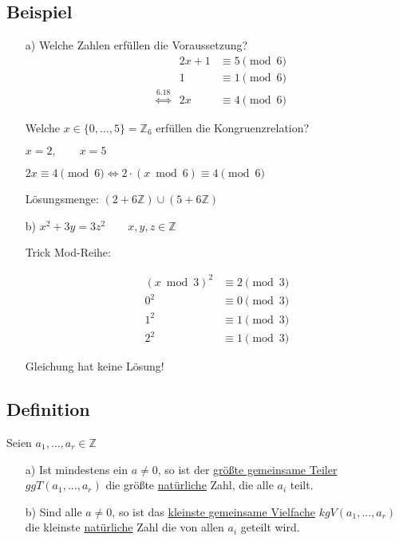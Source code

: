 \documentclass[a4paper, 12pt, twoside] {article}
\begin{document}
\subsection{Beispiel} %

\begin{itemize}
\item[a)] Welche Zahlen erfüllen die Voraussetzung?
\begin{align*}
&											&	2x + 1 &\equiv 5 \pmod 6 \\
&											&	      1 &\equiv 1 \pmod 6 \\
& \overset{\text{6.18}}{\Leftrightarrow}	&	     2x &\equiv 4 \pmod 6
\end{align*}

Welche $x \in \{0,...,5\} = \mathbb{Z}_6$ erfüllen die Kongruenzrelation?

$x=2, \qquad x=5$

$2x \equiv 4 \pmod 6 \Leftrightarrow 2 \cdot (x \bmod 6) \equiv 4 \pmod 6$

Lösungsmenge: $(2+6\mathbb{Z}) \cup (5+6\mathbb{Z})$		

\item[b)] $x^2 + 3y = 3z^2 \qquad x,y,z \in \mathbb{Z}$

Trick Mod-Reihe:

\begin{align*}
	(x \bmod 3)^2 &\equiv 2 \pmod 3 \\
	0^2 &\equiv 0  \pmod 3 \\
	1^2 &\equiv 1 \pmod 3 \\
	2^2 &\equiv 1 \pmod 3
\end{align*}
	
Gleichung hat keine Lösung!

\end{itemize}

\subsection[Definition (größter gemeinsamer Teiler, kleinste gemeinsame Vielfache)]{Definition} %

Seien $a_1, ..., a_r \in \mathbb{Z}$

\begin{itemize}
\item[a)] Ist mindestens ein $a \neq 0$, so ist der \underline{größte gemeinsame Teiler} $ggT(a_1, ..., a_r)$ die größte \underline{natürliche} Zahl, die alle $a_i$ teilt.

\item[b)] Sind alle $a \neq 0$, so ist das \underline{kleinste gemeinsame Vielfache} $kgV(a_1,..., a_r)$ die kleinste \underline{natürliche} Zahl die von allen $a_i$ geteilt wird.

\end{itemize}
\end{document}
